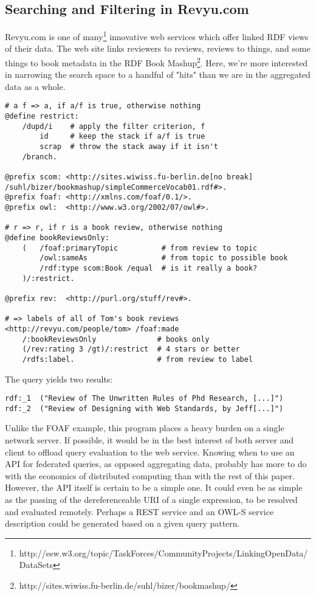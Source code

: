\documentclass[runningheads]{llncs}
\begin{document}
\subsection{Searching and Filtering in Revyu.com}
Revyu.com is one of many\footnote{http://esw.w3.org/topic/TaskForces/CommunityProjects/LinkingOpenData/DataSets} innovative web services which offer linked RDF views of their data.  The web site links reviewers to reviews, reviews to things, and some things to book metadata in the RDF Book Mashup\footnote{http://sites.wiwiss.fu-berlin.de/suhl/bizer/bookmashup/}.  Here, we're 
more interested in narrowing the search space to a handful of "hits" than we are in the aggregated data as a whole.
\begin{verbatim}
# a f => a, if a/f is true, otherwise nothing
@define restrict:
    /dupd/i    # apply the filter criterion, f
        id     # keep the stack if a/f is true
        scrap  # throw the stack away if it isn't
    /branch.

@prefix scom: <http://sites.wiwiss.fu-berlin.de[no break]
/suhl/bizer/bookmashup/simpleCommerceVocab01.rdf#>.
@prefix foaf: <http://xmlns.com/foaf/0.1/>.
@prefix owl:  <http://www.w3.org/2002/07/owl#>.

# r => r, if r is a book review, otherwise nothing
@define bookReviewsOnly:
    (   /foaf:primaryTopic          # from review to topic
        /owl:sameAs                 # from topic to possible book
        /rdf:type scom:Book /equal  # is it really a book?
    )/:restrict.

@prefix rev:  <http://purl.org/stuff/rev#>.

# => labels of all of Tom's book reviews
<http://revyu.com/people/tom> /foaf:made
    /:bookReviewsOnly              # books only
    (/rev:rating 3 /gt)/:restrict  # 4 stars or better
    /rdfs:label.                   # from review to label
\end{verbatim}

The query yields two results:
\begin{verbatim}
rdf:_1  ("Review of The Unwritten Rules of Phd Research, [...]")
rdf:_2  ("Review of Designing with Web Standards, by Jeff[...]")
\end{verbatim}

Unlike the FOAF example, this program places a heavy burden on a single network server.  If possible, it would be in the best interest of both server and client to offload query evaluation to the web service.  Knowing when to use an API for federated queries, as opposed aggregating data, probably has more to do with the economics of distributed computing than with the rest of this paper.  However, the API itself is certain to be a simple one.  It could even be as simple as the passing of the dereferenceable URI of a single expression, to be resolved and evaluated remotely.  Perhaps a REST service and an OWL-S service description could be generated based on a given query pattern.
\end{document}
